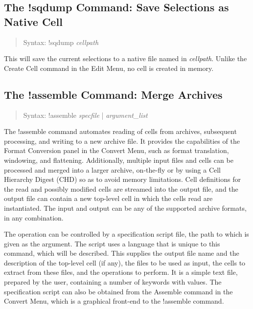 \subsection{The {\cb !sqdump} Command: Save Selections as
 Native Cell}
\begin{quote}
Syntax: {\vt !sqdump} {\it cellpath}
\end{quote}
This will save the current selections to a native file named in {\it
cellpath}.  Unlike the {\cb Create Cell} command in the {\cb Edit
Menu}, no cell is created in memory.

\subsection{The {\cb !assemble} Command: Merge Archives}
\label{assemble}
\begin{quote}
Syntax: {\vt !assemble} {\it specfile} | {\it argument\_list}
\end{quote}
The {\cb !assemble} command automates reading of cells from archives,
subsequent processing, and writing to a new archive file.  It provides
the capabilities of the {\cb Format Conversion} panel in the {\cb
Convert Menu}, such as format translation, windowing, and flattening. 
Additionally, multiple input files and cells can be processed and
merged into a larger archive, on-the-fly or by using a Cell Hierarchy
Digest (CHD) so as to avoid memory limitations.  Cell definitions for
the read and possibly modified cells are streamed into the output
file, and the output file can contain a new top-level cell in which
the cells read are instantiated.  The input and output can be any of
the supported archive formats, in any combination.

The operation can be controlled by a specification script file, the
path to which is given as the argument.  The script uses a language
that is unique to this command, which will be described.  This
supplies the output file name and the description of the top-level
cell (if any), the files to be used as input, the cells to extract
from these files, and the operations to perform.  It is a simple text
file, prepared by the user, containing a number of keywords with
values.  The specification script can also be obtained from the {\cb
Assemble} command in the {\cb Convert Menu}, which is a graphical
front-end to the {\cb !assemble} command.

